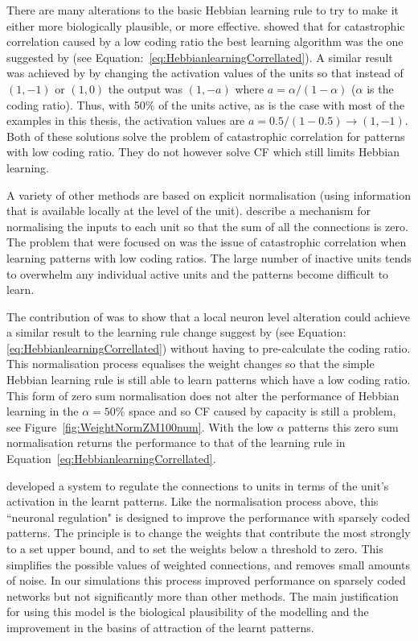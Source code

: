 There are many alterations to the basic Hebbian learning rule to try to make it either more biologically plausible, or more effective. \citet{Dayan1991} showed that for catastrophic correlation caused by a low coding ratio the best learning algorithm was the one suggested by \citet{Amit1987b} (see Equation:~\eqref{eq:HebbianlearningCorrellated}). A similar result was achieved by \citet{Palm1996} by changing the activation values of the units so that instead of $(1,-1)$ or $(1,0)$ the output was $(1,-a)$ where $a = \alpha/(1-\alpha)$ ($\alpha$ is the coding ratio).  Thus, with 50\% of the units active, as is the case with most of the examples in this thesis, the activation values are $a=0.5/(1-0.5) \rightarrow (1,-1)$.  Both of these solutions solve the problem of catastrophic correlation for patterns with low coding ratio.  They do not however solve CF which still limits Hebbian learning.  

A variety of other methods are based on explicit normalisation (using information that is available locally at the level of the unit). \citet{Chechik2001} describe a mechanism for normalising the inputs to each unit so that the sum of all the connections is zero.  The problem that \citet{Chechik2001} were focused on was the issue of catastrophic correlation when learning patterns with low coding ratios.  The large number of inactive units tends to overwhelm any individual active units and the patterns become difficult to learn.  

The contribution of \citet{Chechik2001} was to show that a local neuron level alteration could achieve a similar result to the learning rule change suggest by \citet{Amit1987b}(see Equation:\eqref{eq:HebbianlearningCorrellated}) without having to pre-calculate the coding ratio.  This normalisation process equalises the weight changes so that the simple Hebbian learning rule is still able to learn patterns which have a low coding ratio.  This form of zero sum normalisation does not alter the performance of Hebbian learning in the $\alpha =50\%$ space and so CF caused by capacity is still a problem, see Figure~\ref{fig:WeightNormZM100num}.  With the low $\alpha$ patterns this zero sum normalisation returns the performance to that of the learning rule in Equation~\eqref{eq:HebbianlearningCorrellated}.

\citet{Horn1998a} developed a system to regulate the connections to units in terms of the unit's activation in the learnt patterns.  Like the normalisation process above, this ``neuronal regulation" is designed to improve the performance with sparsely coded patterns.  The principle is to change the weights that contribute the most strongly to a set upper bound, and to set the weights below a threshold to zero.  This simplifies the possible values of weighted connections, and removes small amounts of noise.  In our simulations this process improved performance on sparsely coded networks but not significantly more than other methods.  The main justification for using this model is the biological plausibility of the modelling and the improvement in the basins of attraction of the learnt patterns. 

